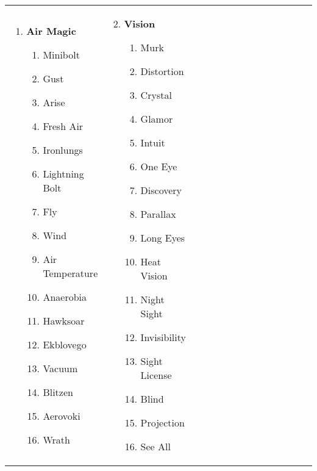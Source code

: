 \renewcommand{\labelenumii}{\arabic{enumii}.}
\begin{tabular}{@{} p{0.25\linewidth} p{0.25\linewidth} p{0.25\linewidth} p{0.25\linewidth}}
\begin{enumerate}
	\item \textbf{Air Magic}
	\begin{enumerate}
		\item Minibolt
		\item Gust
		\item Arise
		\item Fresh Air
		\item Ironlungs
		\item Lightning Bolt
		\item Fly
		\item Wind
		\item Air Temperature
		\item Anaerobia
		\item Hawksoar
		\item Ekblovego
		\item Vacuum
		\item Blitzen
		\item Aerovoki
		\item Wrath
	\end{enumerate}
\end{enumerate} &
\begin{enumerate}
	\setcounter{enumi}{1}
	\item \textbf{Vision}
	\begin{enumerate}
		\item Murk
		\item Distortion
		\item Crystal
		\item Glamor
		\item Intuit
		\item One Eye
		\item Discovery
		\item Parallax
		\item Long Eyes
		\item Heat Vision
		\item Night Sight
		\item Invisibility
		\item Sight License
		\item Blind
		\item Projection
		\item See All
	\end{enumerate}
\end{enumerate} &

\end{tabular}
